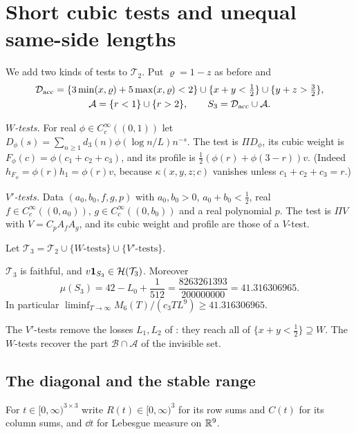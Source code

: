 \documentclass[11pt,colorlinks]{charlie}
\begin{document}
\section{Short cubic tests and unequal same-side lengths}\label{sec:third}

We add two kinds of tests to $\mathcal T_2$. Put $\varrho=1-z$ as before and
\begin{gather*}
 \mathcal D_{\rm acc}=\{3\min(x,\varrho)+5\max(x,\varrho)<2\}\cup\{x+y<\tfrac12\}\cup\{y+z>\tfrac32\},\\
 \mathcal A=\{r<1\}\cup\{r>2\},\qquad S_3=\mathcal D_{\rm acc}\cup\mathcal A .
\end{gather*}

\emph{$W$-tests.} For real $\phi\in C_c^\infty((0,1))$ let $D_\phi(s)=\sum_{n\ge1}d_3(n)\phi(\log n/L)n^{-s}$. The test is $\Pi D_\phi$, its cubic weight is $F_\phi(c)=\phi(c_1+c_2+c_3)$, and its profile is $\frac12(\phi(r)+\phi(3-r))v$. (Indeed $h_{F_\phi}=\phi(r)h_1=\phi(r)v$, because $\kappa(x,y,z;c)$ vanishes unless $c_1+c_2+c_3=r$.)

\emph{$V'$-tests.} Data $(a_0,b_0,f,g,p)$ with $a_0,b_0>0$, $a_0+b_0<\frac12$, real $f\in C_c^\infty((0,a_0))$, $g\in C_c^\infty((0,b_0))$ and a real polynomial $p$. The test is $\Pi V$ with $V=C_pA_fA_g$, and its cubic weight and profile are those of a $V$-test.

Let $\mathcal T_3=\mathcal T_2\cup\{W\text{-tests}\}\cup\{V'\text{-tests}\}$.

\begin{theorem}\label{thm:third}
$\mathcal T_3$ is faithful, and $v\mathbf{1}_{S_3}\in\mathcal H(\mathcal T_3)$. Moreover
\[
 \mu(S_3)=42-L_0+\frac1{512}=\frac{8263261393}{200000000}=41.316306965 .
\]
In particular $\liminf_{T\to\infty}M_6(T)/(c_3TL^9)\ge41.316306965$.
\end{theorem}

The $V'$-tests remove the losses $L_1,L_2$ of : they reach all of $\{x+y<\frac12\}\supseteq W$. The $W$-tests recover the part $\mathcal B\cap\mathcal A$ of the invisible set.

\subsection{The diagonal and the stable range}
For $t\in[0,\infty)^{3\times3}$ write $R(t)\in[0,\infty)^3$ for its row sums and $C(t)$ for its column sums, and $\dd t$ for Lebesgue measure on $\mathbb{R}^9$.
\end{document}
